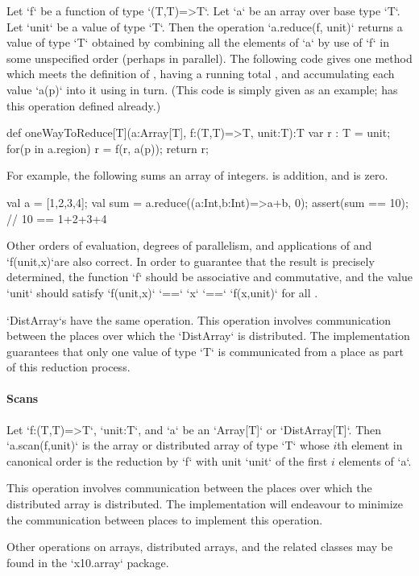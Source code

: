 Let \xcd`f` be a function of type \xcd`(T,T)=>T`.  Let
\xcd`a` be an array over base type \xcd`T`.
Let \xcd`unit` be a value of type \xcd`T`.
Then the
operation \xcd`a.reduce(f, unit)` returns a value of type \xcd`T` obtained
by combining all the elements of \xcd`a` by use of  \xcd`f` in some unspecified order
(perhaps in parallel).   
The following code gives one method which 
meets the definition of ,
having a running total , and accumulating each value \xcd`a(p)` into it
using  in turn.  (This code is simply given as an example; 
has this operation defined already.)
\begin{xten}
def oneWayToReduce[T](a:Array[T], f:(T,T)=>T, unit:T):T {
  var r : T = unit;
  for(p in a.region) r = f(r, a(p));
  return r;
}
\end{xten}


For example,  the following sums an array of integers.   is addition,
and  is zero.  
\begin{xten}
val a = [1,2,3,4];
val sum = a.reduce((a:Int,b:Int)=>a+b, 0); 
assert(sum == 10); // 10 == 1+2+3+4
\end{xten}

Other orders of evaluation, degrees of parallelism, and applications of
 and \xcd`f(unit,x)`are also correct.
In order to guarantee that the result is precisely
determined, the  function \xcd`f` should be associative and
commutative, and the value \xcd`unit` should satisfy
\xcd`f(unit,x)` \xcd`==` \xcd`x` \xcd`==` \xcd`f(x,unit)`
for all .  




\xcd`DistArray`s have the same operation.
This operation involves communication between the places over which
the \xcd`DistArray` is distributed. The \Xten{} implementation guarantees that
only one value of type \xcd`T` is communicated from a place as part of
this reduction process.

\paragraph{Scans}\label{ArrayScans}


Let \xcd`f:(T,T)=>T`, \xcd`unit:T`, and \xcd`a` be an \xcd`Array[T]` or
\xcd`DistArray[T]`.  Then \xcd`a.scan(f,unit)` is the array or distributed
array of type \xcd`T` whose {$i$}th element in canonical order is the
reduction by \xcd`f` with unit \xcd`unit` of the first {$i$} elements of
\xcd`a`. 


This operation involves communication between the places over which the
distributed array is distributed. The \Xten{} implementation will endeavour to
minimize the communication between places to implement this operation.

Other operations on arrays, distributed arrays, and the related classes may be
found in the \xcd`x10.array` package.
